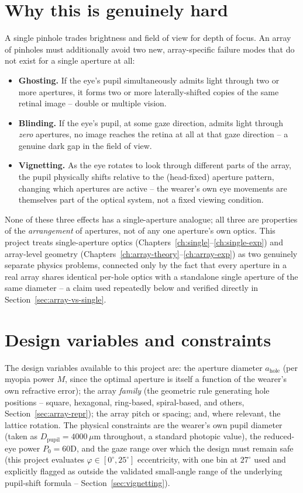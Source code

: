 \documentclass[11pt]{report}
\begin{document}
\section{Why this is genuinely hard}
A single pinhole trades brightness and field of view for depth of focus. An array of
pinholes must additionally avoid two new, array-specific failure modes that do not
exist for a single aperture at all:
\begin{itemize}
  \item \textbf{Ghosting.} If the eye's pupil simultaneously admits light through two
  or more apertures, it forms two or more laterally-shifted copies of the same retinal
  image -- double or multiple vision.
  \item \textbf{Blinding.} If the eye's pupil, at some gaze direction, admits light
  through \emph{zero} apertures, no image reaches the retina at all at that gaze
  direction -- a genuine dark gap in the field of view.
  \item \textbf{Vignetting.} As the eye rotates to look through different parts of the
  array, the pupil physically shifts relative to the (head-fixed) aperture pattern,
  changing which apertures are active -- the wearer's own eye movements are themselves
  part of the optical system, not a fixed viewing condition.
\end{itemize}
None of these three effects has a single-aperture analogue; all three are properties of
the \emph{arrangement} of apertures, not of any one aperture's own optics. This project
treats single-aperture optics (Chapters~\ref{ch:single}--\ref{ch:single-exp}) and
array-level geometry (Chapters~\ref{ch:array-theory}--\ref{ch:array-exp}) as two
genuinely separate physics problems, connected only by the fact that every aperture in
a real array shares identical per-hole optics with a standalone single aperture of the
same diameter -- a claim used repeatedly below and verified directly in
Section~\ref{sec:array-vs-single}.

\section{Design variables and constraints}
The design variables available to this project are: the aperture diameter
$a_{\mathrm{hole}}$ (per myopia power $M$, since the optimal aperture is itself a
function of the wearer's own refractive error); the array \emph{family} (the geometric
rule generating hole positions -- square, hexagonal, ring-based, spiral-based, and
others, Section~\ref{sec:array-repr}); the array pitch or spacing; and, where relevant,
the lattice rotation. The physical constraints are the wearer's own pupil diameter
(taken as $D_{\mathrm{pupil}}=4000\,\mu$m throughout, a standard photopic value), the
reduced-eye power $P_0=60$D, and the gaze range over which the design must remain safe
(this project evaluates $\varphi\in[0^\circ,25^\circ]$ eccentricity, with one bin at
$27^\circ$ used and explicitly flagged as outside the validated small-angle range of
the underlying pupil-shift formula -- Section~\ref{sec:vignetting}).
\end{document}
